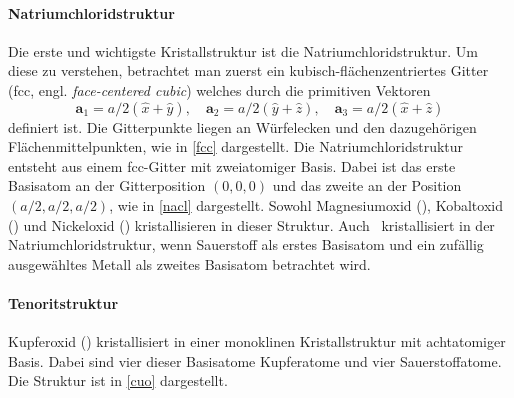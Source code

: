 \paragraph{Natriumchloridstruktur}
Die erste und wichtigste Kristallstruktur ist die Natriumchloridstruktur.
Um diese zu verstehen, betrachtet man zuerst ein kubisch-flächen\-zen\-trier\-tes Gitter (fcc, engl.
\textit{face-centered cubic}) welches durch die primitiven Vektoren
\begin{equation}
    \mathbf{a}_1 = a / 2 (\hat{x} + \hat{y}), \quad
    \mathbf{a}_2 = a / 2 (\hat{y} + \hat{z}), \quad
    \mathbf{a}_3 = a / 2 (\hat{x} + \hat{z})
    \label{eq:fcc}
\end{equation}
definiert ist.
Die Gitterpunkte liegen an Würfelecken und den dazugehörigen Flächenmittelpunkten, wie in \cref{fcc} dargestellt.
\autocite[37-38]{Grundmann}
Die Natriumchloridstruktur entsteht aus einem fcc-Gitter mit zweiatomiger Basis.
Dabei ist das erste Basisatom an der Gitterposition $(0,0,0)$ und das zweite an der Position $(a/2,a/2,a/2)$, wie in
\cref{nacl} dargestellt.\autocite[45]{Grundmann}
Sowohl Magnesiumoxid (), Kobaltoxid () und Nickeloxid () kristallisieren in dieser Struktur.
Auch \heo\ kristallisiert in der Natriumchloridstruktur, wenn
Sauerstoff als erstes Basisatom und ein zufällig ausgewähltes Metall als zweites Basisatom betrachtet wird.
\autocite[5]{Rost2015}

\paragraph{Tenoritstruktur}
Kupferoxid () kristallisiert in einer monoklinen Kristall\-struk\-tur mit achtatomiger Basis.
Dabei sind vier dieser Basisatome Kupferatome und vier Sauerstoffatome.
Die Struktur ist in \cref{cuo} dargestellt.\autocite[7]{kupferoxid}

